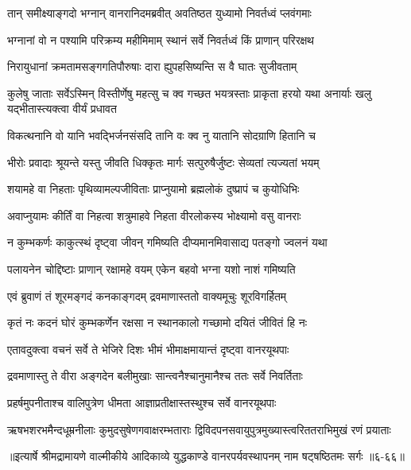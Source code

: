 \twolineshloka
{तान् समीक्ष्याङ्गदो भग्नान् वानरानिदमब्रवीत्}
{अवतिष्ठत युध्यामो निवर्तध्वं प्लवंगमाः} %

\twolineshloka
{भग्नानां वो न पश्यामि परिक्रम्य महीमिमाम्}
{स्थानं सर्वे निवर्तध्वं किं प्राणान् परिरक्षथ} %

\twolineshloka
{निरायुधानां क्रमतामसङ्गगतिपौरुषाः}
{दारा ह्युपहसिष्यन्ति स वै घातः सुजीवताम्} %

\threelineshloka
{कुलेषु जाताः सर्वेऽस्मिन् विस्तीर्णेषु महत्सु च}
{क्व गच्छत भयत्रस्ताः प्राकृता हरयो यथा}
{अनार्याः खलु यद्भीतास्त्यक्त्वा वीर्यं प्रधावत} %

\twolineshloka
{विकत्थनानि वो यानि भवद्भिर्जनसंसदि}
{तानि वः क्व नु यातानि सोदग्राणि हितानि च} %

\twolineshloka
{भीरोः प्रवादाः श्रूयन्ते यस्तु जीवति धिक्कृतः}
{मार्गः सत्पुरुषैर्जुष्टः सेव्यतां त्यज्यतां भयम्} %

\twolineshloka
{शयामहे वा निहताः पृथिव्यामल्पजीविताः}
{प्राप्नुयामो ब्रह्मलोकं दुष्प्रापं च कुयोधिभिः} %

\twolineshloka
{अवाप्नुयामः कीर्तिं वा निहत्वा शत्रुमाहवे}
{निहता वीरलोकस्य भोक्ष्यामो वसु वानराः} %

\twolineshloka
{न कुम्भकर्णः काकुत्स्थं दृष्ट्वा जीवन् गमिष्यति}
{दीप्यमानमिवासाद्य पतङ्गो ज्वलनं यथा} %

\twolineshloka
{पलायनेन चोद्दिष्टाः प्राणान् रक्षामहे वयम्}
{एकेन बहवो भग्ना यशो नाशं गमिष्यति} %

\twolineshloka
{एवं ब्रुवाणं तं शूरमङ्गदं कनकाङ्गदम्}
{द्रवमाणास्ततो वाक्यमूचुः शूरविगर्हितम्} %

\twolineshloka
{कृतं नः कदनं घोरं कुम्भकर्णेन रक्षसा}
{न स्थानकालो गच्छामो दयितं जीवितं हि नः} %

\twolineshloka
{एतावदुक्त्वा वचनं सर्वे ते भेजिरे दिशः}
{भीमं भीमाक्षमायान्तं दृष्ट्वा वानरयूथपाः} %

\twolineshloka
{द्रवमाणास्तु ते वीरा अङ्गदेन बलीमुखाः}
{सान्त्वनैश्चानुमानैश्च ततः सर्वे निवर्तिताः} %

\twolineshloka
{प्रहर्षमुपनीताश्च वालिपुत्रेण धीमता}
{आज्ञाप्रतीक्षास्तस्थुश्च सर्वे वानरयूथपाः} %

\twolineshloka
{ऋषभशरभमैन्दधूम्रनीलाः कुमुदसुषेणगवाक्षरम्भताराः}
{द्विविदपनसवायुपुत्रमुख्यास्त्वरिततराभिमुखं रणं प्रयाताः} %


॥इत्यार्षे श्रीमद्रामायणे वाल्मीकीये आदिकाव्ये युद्धकाण्डे वानरपर्यवस्थापनम् नाम षट्षष्ठितमः सर्गः ॥६-६६॥
